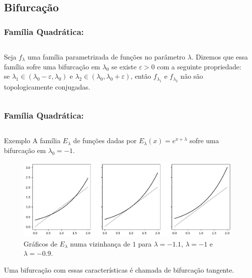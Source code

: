 \subsection{Bifurcação}


\begin{frame}
\vspace{5pt}
\frametitle{Família Quadrática: \subsecname}
\begin{columns}
\column{\dimexpr\paperwidth-15pt}

\begin{definition}
Seja $f_\lambda$ uma família parametrizada de funções no parâmetro $\lambda$. Dizemos que essa família sofre uma bifurcação em $\lambda_0$ se existe $\varepsilon > 0$ com a seguinte propriedade:\\se $\lambda_1 \in (\lambda_0 - \varepsilon, \lambda_0)$ e $\lambda_2 \in (\lambda_0, \lambda_0 + \varepsilon)$, então $f_{\lambda_1}$ e $f_{\lambda_2}$ não são topologicamente conjugadas.
\end{definition}

\end{columns}
\end{frame}


\begin{frame}
\vspace{5pt}
\frametitle{Família Quadrática: \subsecname}
\begin{columns}
\column{\dimexpr\paperwidth-15pt}

\begin{block}{Exemplo}
A família $E_\lambda$ de funções dadas por $E_\lambda(x) = e^{x + \lambda}$ sofre uma bifurcação em $\lambda_0 = -1$.

\vspace{10pt}

\begin{figure}[!htb]
\centering
\includegraphics[scale=0.4]{images/e_lambda.png}
\caption{Gráficos de $E_\lambda$ numa vizinhança de $1$ para $\lambda = -1.1$, $\lambda = -1$ e $\lambda = -0.9$.}
\end{figure}
Uma bifurcação com essas características é chamada de bifurcação tangente.
\end{block}

\end{columns}
\end{frame}

